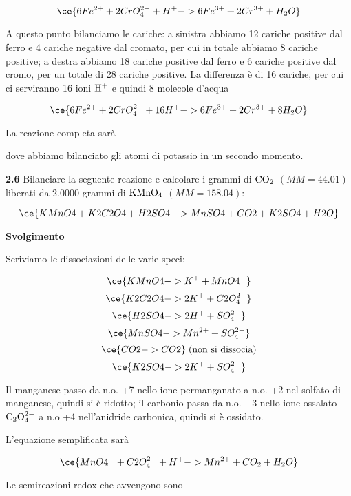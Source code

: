 $$\ce{6Fe^{2+} + 2CrO_4^{2-} + H^+ -> 6Fe^{3+} + 2Cr^{3+} + H_2O}$$

A questo punto bilanciamo le cariche: a sinistra abbiamo 12 cariche positive dal ferro e 4 cariche negative dal cromato, per cui in totale abbiamo 8 cariche positive; a destra abbiamo 18 cariche positive dal ferro e 6 cariche positive dal cromo, per un totale di 28 cariche positive. La differenza è di 16 cariche, per cui ci serviranno 16 ioni $\rm H^+$ e quindi 8 molecole d'acqua

$$\ce{6Fe^{2+} + 2CrO_4^{2-} + 16H^+ -> 6Fe^{3+} + 2Cr^{3+} + 8H_2O}$$

La reazione completa sarà

\begin{center}



\end{center}

dove abbiamo bilanciato gli atomi di potassio in un secondo momento.

\vspace{0.2cm}\textbf{2.6}  Bilanciare la seguente reazione e calcolare i grammi di $\rm CO_2$ $(MM=44.01)$ liberati da 2.0000 grammi di $\rm KMnO_4$ $(MM=158.04)$:

$$\ce{KMnO4 + K2C2O4 + H2SO4 -> MnSO4 + CO2 + K2SO4 + H2O}$$

\vspace{0.2cm}\large\textbf{Svolgimento}\normalsize

\vspace{0.2cm}Scriviamo le dissociazioni delle varie speci:

$$\ce{KMnO4 -> K^+ + MnO4^-}$$
$$\ce{K2C2O4 -> 2K^+ + C2O_4^{2-}}$$
$$\ce{H2SO4 -> 2H^+ + SO_4^{2-}}$$
$$\ce{MnSO4 -> Mn^{2+} + SO_4^{2-}}$$
$$\ce{CO2 -> CO2}\;\text{(non si dissocia)}$$
$$\ce{K2SO4 -> 2K^+ + SO_4^{2-}}$$

Il manganese passo da n.o. +7 nello ione permanganato a n.o. +2 nel solfato di manganese, quindi si è ridotto; il carbonio passa da n.o. +3 nello ione ossalato $\rm C_2O_4^{2-}$ a n.o +4 nell'anidride carbonica, quindi si è ossidato.

L'equazione semplificata sarà

$$\ce{MnO4^- + C2O_4^{2-} + H^+ -> Mn^{2+} + CO_2 + H_2O}$$

Le semireazioni redox che avvengono sono

